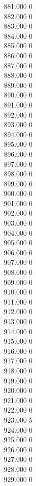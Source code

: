 { 881.000	0 \\
 882.000	0 \\
 883.000	0 \\
 884.000	0 \\
 885.000	0 \\
 886.000	0 \\
 887.000	0 \\
 888.000	0 \\
 889.000	0 \\
 890.000	0 \\
 891.000	0 \\
 892.000	0 \\
 893.000	0 \\
 894.000	0 \\
 895.000	0 \\
 896.000	0 \\
 897.000	0 \\
 898.000	0 \\
 899.000	0 \\
 900.000	0 \\
 901.000	0 \\
 902.000	0 \\
 903.000	0 \\
 904.000	0 \\
 905.000	0 \\
 906.000	0 \\
 907.000	0 \\
 908.000	0 \\
 909.000	0 \\
 910.000	0 \\
 911.000	0 \\
 912.000	0 \\
 913.000	0 \\
 914.000	0 \\
 915.000	0 \\
 916.000	0 \\
 917.000	0 \\
 918.000	0 \\
 919.000	0 \\
 920.000	0 \\
 921.000	0 \\
 922.000	0 \\
 923.000	5 \\
 924.000	0 \\
 925.000	0 \\
 926.000	0 \\
 927.000	0 \\
 928.000	0 \\
 929.000	0 \\
}
